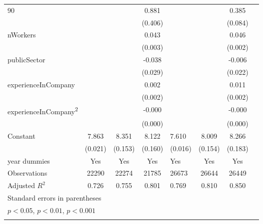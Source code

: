 {\begin{longtable}{l*{3}{c}|l*{3}{c}}
		90                  &                     &                     &       0.881\sym{*}  &                     &                     &       0.385\sym{***}\\
		&                     &                     &     (0.406)         &                     &                     &     (0.084)         \\
		nWorkers            &                     &                     &       0.043\sym{***}&                     &                     &       0.046\sym{***}\\
		&                     &                     &     (0.003)         &                     &                     &     (0.002)         \\
		publicSector      &                     &                     &      -0.038         &                     &                     &      -0.006         \\
		&                     &                     &     (0.029)         &                     &                     &     (0.022)         \\
		experienceInCompany &                     &                     &       0.002         &                     &                     &       0.011\sym{***}\\
		&                     &                     &     (0.002)         &                     &                     &     (0.002)         \\
		experienceInCompany\textsuperscript{2}&                     &                     &      -0.000         &                     &                     &      -0.000\sym{***}\\
		&                     &                     &     (0.000)         &                     &                     &     (0.000)         \\
		Constant            &       7.863\sym{***}&       8.351\sym{***}&       8.122\sym{***}&       7.610\sym{***}&       8.009\sym{***}&       8.266\sym{***}\\
		&     (0.021)         &     (0.153)         &     (0.160)         &     (0.016)         &     (0.154)         &     (0.183)         \\
		year dummies        &         Yes         &         Yes         &         Yes         &         Yes         &         Yes         &         Yes         \\
		\midrule
		Observations        &       22290         &       22274         &       21785         &       26673         &       26644         &       26449         \\
		Adjusted \(R^{2}\)  &       0.726         &       0.755         &       0.801         &       0.769         &       0.810         &       0.850         \\
		\bottomrule
		\multicolumn{7}{l}{\footnotesize Standard errors in parentheses}\\
		\multicolumn{7}{l}{\footnotesize \sym{*} \(p<0.05\), \sym{**} \(p<0.01\), \sym{***} \(p<0.001\)}\\
          \label{tab:et_wage_full}
	\end{longtable}
}
